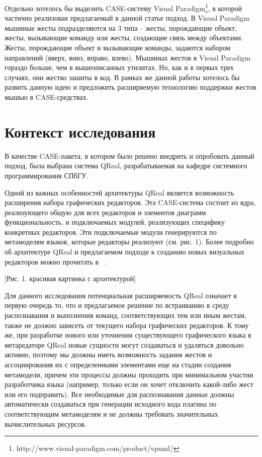 \documentclass[a5paper]{article}
\begin{document}
Отдельно хотелось бы выделить CASE-систему Visual Paradigm\footnote{http://www.visual-paradigm.com/product/vpuml/}, в которой частично реализован 
предлагаемый в данной статье подход. 
В Visual Paradigm мышиные жесты подразделяются на 3 типа – жесты, порождающие объект, жесты, вызывающие команду или жесты, 
создающие связь между объектами. Жесты, порождающие объект и вызывающие команды, задаются набором направлений (вверх, вниз, вправо, влево). 
Мышиных жестов в Visual Paradigm гораздо больше, чем в вышеописанных утилитах. Но, как и в первых трех случаях, они жестко
зашиты в код. В рамках же данной работы хотелось бы развить данную идею и предложить расширяемую технологию поддержки
жестов мышью в CASE-средствах.



\section{Контекст исследования}
В качестве CASE-пакета, в котором было решено внедрить и опробовать данный подход, была выбрана система QReal, разрабатываемая на кафедре 
системного программирования СПбГУ. 

Одной из важных особенностей архитектуры QReal является возможность расширения набора графических редакторов. Эта CASE-система состоит 
из ядра, реализующего общую для всех редакторов и элементов диаграмм функциональность, и подключаемых модулей, реализующих специфику 
конкретных редакторов. Эти подключаемые модули генерируются по метамоделям языков, которые редакторы реализуют (см. рис. 1). 
Более подробно об архитектуре QReal и предлагаемом подходе к  созданию новых визуальных редакторов можно прочитать в ~\cite{qrealBasic}. 

[Рис. 1. красивая картинка с архитектурой]

Для данного исследования потенциальная расширяемость QReal означает в первую очередь то, что и предлагаемое решение по встраиванию в среду 
распознавания и выполнения команд, соответствующих тем или иным жестам, также не должно зависеть от текущего набора графических редакторов. 
К тому же, при разработке нового или уточнении существующего графического языка в метаредаторе QReal новые сущности могут создаваться и 
удаляться довольно активно, поэтому мы должны иметь возможность задания жестов и ассоциирования их с определенными элементами еще на стадии
создания метамодели, причем эти процессы должны проходить при минимальном участии разработчика языка (например, только если он хочет 
отключить какой-либо жест или его подправить). Все необходимые для распознавания данные должны автоматически создаваться при генерации 
исходного кода плагина по соответствующим метамоделям и не должны требовать значительных вычислительных ресурсов.
\end{document}
